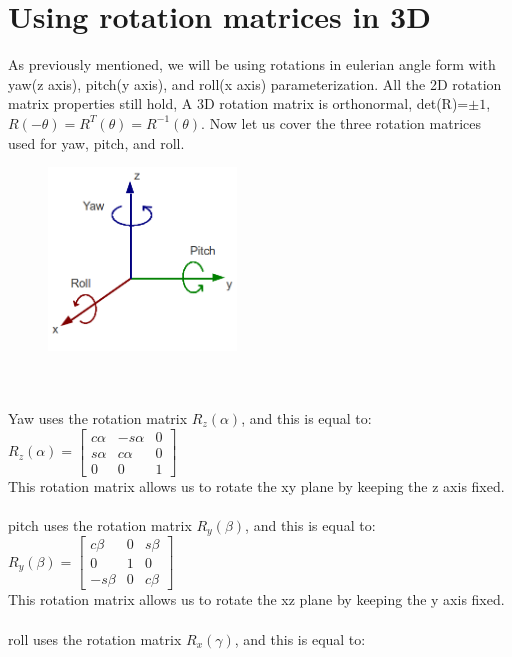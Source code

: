 \documentclass{article}
\begin{document}
\section{Using rotation matrices in 3D}
As previously mentioned, we will be using rotations in eulerian angle form with yaw(z axis), pitch(y axis), and roll(x axis) parameterization. All the 2D rotation matrix properties still hold, A 3D rotation matrix is orthonormal, det(R)=$\pm1$, $R(-\theta)=R^T(\theta)=R^{-1}(\theta)$. Now let us cover the three rotation matrices used for yaw, pitch, and roll.\\
\begin{figure}[htp]
    \centering
    \includegraphics[width=5cm ]{ypr.png}
    \caption{}
    \label{fig:pubsub}
\end{figure}\\\\
Yaw uses the rotation matrix $R_z(\alpha)$, and this is equal to:\\
$R_z(\alpha)=\begin{bmatrix}
c\alpha & -s\alpha & 0 \\
s\alpha & c\alpha & 0\\
0 & 0 & 1
\end{bmatrix}$\\
This rotation matrix allows us to rotate the xy plane by keeping the z axis fixed.\\\\
pitch uses the rotation matrix $R_y(\beta)$, and this is equal to:\\
$R_y(\beta)=\begin{bmatrix}
c\beta & 0 & s\beta \\
0 & 1 & 0\\
-s\beta & 0 & c\beta
\end{bmatrix}$\\
This rotation matrix allows us to rotate the xz plane by keeping the y axis fixed.\\\\
roll uses the rotation matrix $R_x(\gamma)$, and this is equal to:\\
\end{document}
